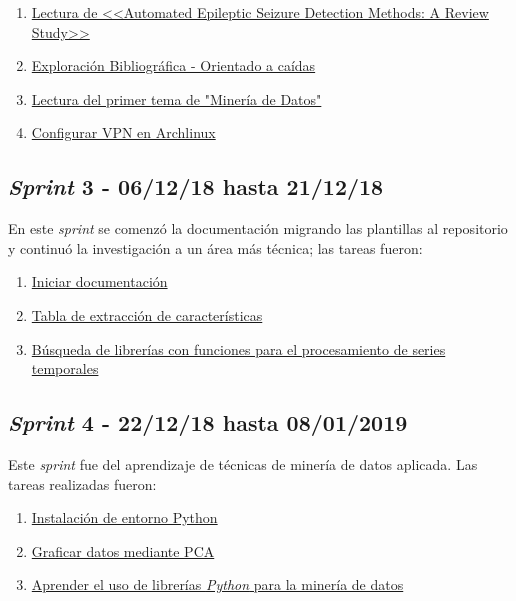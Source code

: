 \begin{enumerate}\addtocounter{enumi}{2}
	\item \href{https://github.com/joselucross/TFG-SmartBeds/issues/3}{Lectura de <<Automated Epileptic Seizure Detection Methods: A Review Study>>}
	\item \href{https://github.com/joselucross/TFG-SmartBeds/issues/4}{Exploración Bibliográfica - Orientado a caídas}
	\item \href{https://github.com/joselucross/TFG-SmartBeds/issues/5}{ Lectura del primer tema de "Minería de Datos"}
	\item \href{https://github.com/joselucross/TFG-SmartBeds/issues/6}{ Configurar VPN en Archlinux}
\end{enumerate}

\subsection{\textit{Sprint} 3 - 06/12/18 hasta 21/12/18}
En este \textit{sprint} se comenzó la documentación migrando las plantillas al repositorio y continuó la investigación a un área más técnica; las tareas fueron:

\begin{enumerate}\addtocounter{enumi}{6}
	\item \href{https://github.com/joselucross/TFG-SmartBeds/issues/7}{Iniciar documentación}
	\item \href{https://github.com/joselucross/TFG-SmartBeds/issues/8}{Tabla de extracción de características}
	\item \href{https://github.com/joselucross/TFG-SmartBeds/issues/9}{ Búsqueda de librerías con funciones para el procesamiento de series temporales}
	
\end{enumerate}

\subsection{\textit{Sprint} 4 - 22/12/18 hasta 08/01/2019}
Este \textit{sprint} fue del aprendizaje de técnicas de minería de datos aplicada. Las tareas realizadas fueron:

\begin{enumerate}\addtocounter{enumi}{9}
	\item \href{https://github.com/joselucross/TFG-SmartBeds/issues/10}{ Instalación de entorno Python}
	\item \href{https://github.com/joselucross/TFG-SmartBeds/issues/11}{ Graficar datos mediante PCA}
	\item \href{https://github.com/joselucross/TFG-SmartBeds/issues/12}{ Aprender el uso de librerías \textit{Python} para la minería de datos}
\end{enumerate}

